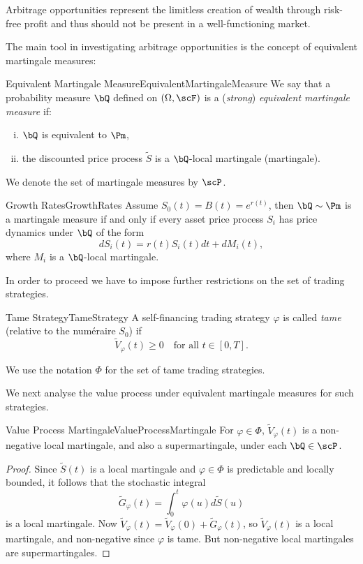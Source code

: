 Arbitrage opportunities represent the limitless creation of wealth through
risk-free profit and thus should not be present in a well-functioning market.

The main tool in investigating arbitrage opportunities is the concept of
equivalent martingale measures:

\begin{defn}{Equivalent Martingale Measure}{EquivalentMartingaleMeasure}
	We say that a probability measure \(\bQ\) defined on \((\Omega, \scF)\) is a (\textit{strong}) \textit{equivalent martingale measure} if:
	\begin{enumerate}[(i)]
		\item \(\bQ\) is equivalent to \(\Pm\),
		\item the discounted price process \(\tilde{S}\) is a \(\bQ\)-local martingale (martingale).
	\end{enumerate}
	We denote the set of martingale measures by \(\scP\).
\end{defn}

\begin{lem}{Growth Rates}{GrowthRates}
	Assume \(S_0(t) = B(t) = e^{r(t)}\), then \(\bQ \sim \Pm\) is a martingale measure if and only if every asset price process \(S_i\) has price dynamics under \(\bQ\) of the form
	\[
		dS_i(t) = r(t)S_i(t)dt + dM_i(t),
	\]
	where \(M_i\) is a \(\bQ\)-local martingale.
\end{lem}

In order to proceed we have to impose further restrictions on the set of trading strategies.

\begin{defn}{Tame Strategy}{TameStrategy}
	A self-financing trading strategy \(\varphi\) is called \textit{tame} (relative to the num\'{e}raire \(S_0\)) if
	\[
		\tilde{V}_{\varphi}(t) \ge 0 \quad \text{for all } t \in [0, T].
	\]

	We use the notation \(\Phi\) for the set of tame trading strategies.
\end{defn}

We next analyse the value process under equivalent martingale measures for such strategies.

\begin{prop}{Value Process Martingale}{ValueProcessMartingale}
	For \(\varphi \in \Phi\), \(\tilde{V}_{\varphi}(t)\) is a non-negative local martingale, and also a supermartingale, under each \(\bQ \in \scP\).
\end{prop}

\begin{proof}
	Since \(\tilde{S}(t)\) is a local martingale and \(\varphi \in \Phi\) is predictable and locally bounded, it follows that the stochastic integral
	\[
		\tilde{G}_{\varphi}(t) = \int_0^t \varphi(u)d\tilde{S}(u)
	\]
	is a local martingale. Now \(\tilde{V}_{\varphi}(t) = \tilde{V}_{\varphi}(0) + \tilde{G}_{\varphi}(t)\), so \(\tilde{V}_{\varphi}(t)\) is a local martingale, and non-negative since \(\varphi\) is tame. But non-negative local martingales are supermartingales.
\end{proof}

